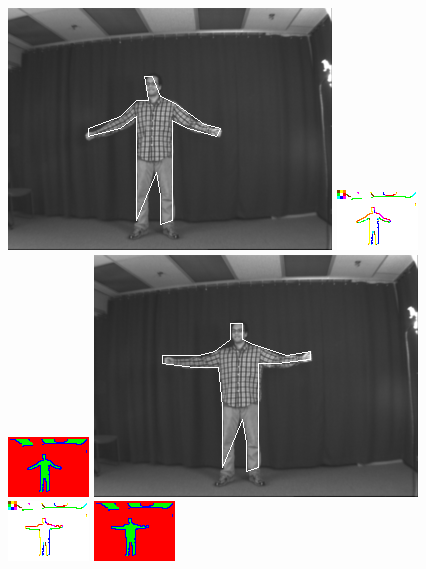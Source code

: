 \documentclass{tufte-book}
\begin{document}
\begin{figure}
\includegraphics[width=0.3 \linewidth]{output/2.detection/image_parsing/out.2.d/thefinalparse.png}
\includegraphics[width=0.3 \linewidth]{output/2.detection/image_parsing/out.2.d/local.x5.orientations.png}
\includegraphics[width=0.3 \linewidth]{output/2.detection/image_parsing/out.2.d/local.x5.interior.png}
\includegraphics[width=0.3 \linewidth]{output/2.detection/image_parsing/out.3.d/thefinalparse.png}
\includegraphics[width=0.3 \linewidth]{output/2.detection/image_parsing/out.3.d/local.x5.orientations.png}
\includegraphics[width=0.3 \linewidth]{output/2.detection/image_parsing/out.3.d/local.x5.interior.png}

\end{figure}
\end{document}
